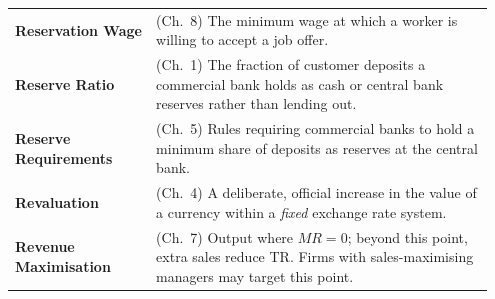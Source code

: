 \documentclass[11pt, a4paper, twoside]{book}
\begin{document}
\begin{longtable}{@{}>{\RaggedRight\arraybackslash}p{0.28\linewidth}>{\RaggedRight\arraybackslash}p{0.67\linewidth}@{}}
\textbf{Reservation Wage} & (Ch.~8) The minimum wage at which a worker is willing to accept a job offer. \\
\textbf{Reserve Ratio} & (Ch.~1) The fraction of customer deposits a commercial bank holds as cash or central bank reserves rather than lending out. \\
\textbf{Reserve Requirements} & (Ch.~5) Rules requiring commercial banks to hold a minimum share of deposits as reserves at the central bank. \\
\textbf{Revaluation} & (Ch.~4) A deliberate, official increase in the value of a currency within a \emph{fixed} exchange rate system. \\
\textbf{Revenue Maximisation} & (Ch.~7) Output where $MR = 0$; beyond this point, extra sales reduce TR. Firms with sales-maximising managers may target this point. \\


\end{longtable}
\end{document}
